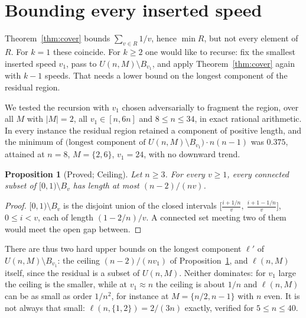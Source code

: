 \documentclass[11pt]{amsart}
\theoremstyle{plain}
\newtheorem{proposition}[theorem]{Proposition}
\theoremstyle{definition}
\begin{document}
\section{Bounding every inserted speed}\label{sec:open}

Theorem~\ref{thm:cover} bounds $\sum_{v\in R}1/v$, hence $\min R$, but not every element of $R$. For
$k=1$ these coincide. For $k\ge2$ one would like to recurse: fix the smallest inserted speed $v_1$,
pass to $U(n,M)\setminus B_{v_1}$, and apply Theorem~\ref{thm:cover} again with $k-1$ speeds. That
needs a lower bound on the longest component of the residual region.

We tested the recursion with $v_1$ chosen adversarially to fragment the region, over all $M$ with
$|M|=2$, all $v_1\in[n,6n]$ and $8\le n\le34$, in exact rational arithmetic. In every instance the
residual region retained a component of positive length, and the minimum of
$\bigl(\text{longest component of } U(n,M)\setminus B_{v_1}\bigr)\cdot n(n-1)$ was $0.375$, attained
at $n=8$, $M=\{2,6\}$, $v_1=24$, with no downward trend.

\begin{proposition}[Proved; Ceiling]\label{prop:ceiling}
Let $n\ge3$. For every $v\ge1$, every connected subset of $[0,1)\setminus B_v$ has length at most
$(n-2)/(nv)$.
\end{proposition}

\begin{proof}
$[0,1)\setminus B_v$ is the disjoint union of the closed intervals
$\bigl[\tfrac{i+1/n}{v},\ \tfrac{i+1-1/n}{v}\bigr]$, $0\le i<v$, each of length $(1-2/n)/v$. A
connected set meeting two of them would meet the open gap between.
\end{proof}

There are thus two hard upper bounds on the longest component $\ell'$ of
$U(n,M)\setminus B_{v_1}$: the ceiling $(n-2)/(nv_1)$ of Proposition~\ref{prop:ceiling}, and
$\ell(n,M)$ itself, since the residual is a subset of $U(n,M)$. Neither dominates: for $v_1$ large the ceiling is the smaller, while at $v_1\approx n$ the ceiling
is about $1/n$ and $\ell(n,M)$ can be as small as order $1/n^{2}$, for instance at
$M=\{n/2,n-1\}$ with $n$ even. It is not always that small: $\ell(n,\{1,2\})=2/(3n)$ exactly, verified for $5\le n\le40$.
\end{document}
